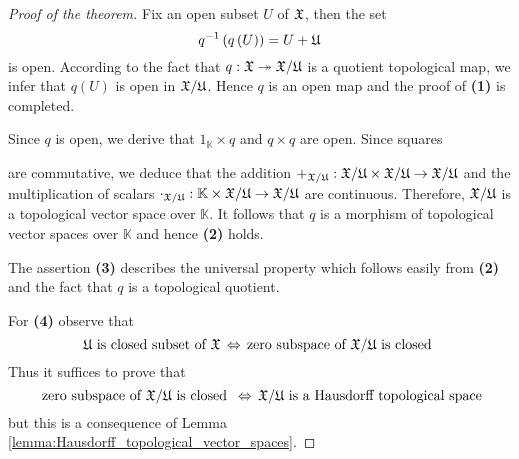 \begin{proof}[Proof of the theorem]
   Fix an open subset $U$ of ${\mathfrak X}$, then the set
   $$q^{-1}\left(q\left(U\right)\right) = U + {\mathfrak U}$$
   is open. According to the fact that $q:{\mathfrak X}\twoheadrightarrow {\mathfrak X}/{\mathfrak U}$ is a quotient topological map, we infer that $q(U)$ is open in ${\mathfrak X}/{\mathfrak U}$. Hence $q$ is an open map and the proof of \textbf{(1)} is completed.

   Since $q$ is open, we derive that $1_{\mathbb{K}}\times q$ and $q\times q$ are open. Since squares
   \begin{center}
   \end{center}
   are commutative, we deduce that the addition $+_{{\mathfrak X}/{\mathfrak U}}:{\mathfrak X}/{\mathfrak U} \times {\mathfrak X}/{\mathfrak U} \rightarrow {\mathfrak X}/{\mathfrak U}$ and the multiplication of scalars $\cdot_{{\mathfrak X}/{\mathfrak U}}:\mathbb{K}\times {\mathfrak X}/{\mathfrak U}\rightarrow {\mathfrak X}/{\mathfrak U}$ are continuous. Therefore, ${\mathfrak X}/{\mathfrak U}$ is a topological vector space over $\mathbb{K}$. It follows that $q$ is a morphism of topological vector spaces over $\mathbb{K}$ and hence \textbf{(2)} holds.

   The assertion \textbf{(3)} describes the universal property which follows easily from \textbf{(2)} and the fact that $q$ is a topological quotient.

   For \textbf{(4)} observe that
   $${\mathfrak U}\mbox{ is closed subset of }{\mathfrak X}\,\Leftrightarrow\,\mbox{zero subspace of }{\mathfrak X}/{\mathfrak U}\mbox{ is closed }$$
   Thus it suffices to prove that
   $$\mbox{ zero subspace of }{\mathfrak X}/{\mathfrak U}\mbox{ is closed }\,\Leftrightarrow\,{\mathfrak X}/{\mathfrak U}\mbox{ is a Hausdorff topological space}$$
   but this is a consequence of Lemma \ref{lemma:Hausdorff_topological_vector_spaces}.
\end{proof}

